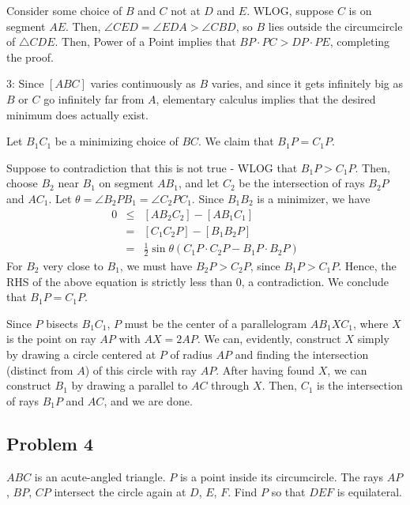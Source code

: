 \begin{mdsoln}
Consider some choice of $B$ and $C$ not at $D$ and $E$. WLOG, suppose $C$ is on segment $AE$. Then, $\angle CED=\angle EDA > \angle CBD $, so $B$ lies outside the circumcircle of $\triangle CDE$. Then, Power of a Point implies that $BP \cdot PC > DP\cdot PE$, completing the proof.

3:
Since $[ABC]$ varies continuously as $B$ varies, and since it gets infinitely big as $B$ or $C$ go infinitely far from $A$, elementary calculus implies that the desired minimum does actually exist.

Let $B_1C_1$ be a minimizing choice of $BC$. We claim that $B_1P=C_1P$.

Suppose to contradiction that this is not true - WLOG that $B_1P>C_1P$. Then, choose $B_2$ near $B_1$ on segment $AB_1$, and let $C_2$ be the intersection of rays $B_2P$ and $AC_1$. Let $\theta=\angle B_2PB_1=\angle C_2PC_1$. Since $B_1B_2$ is a minimizer, we have\begin{eqnarray*}0&\le&[AB_2C_2]-[AB_1C_1]\\ &=&[C_1C_2P]-[B_1B_2P]\\ &=&\frac{1}{2}\sin\theta\left(C_1P\cdot C_2P-B_1P\cdot B_2P\right)\end{eqnarray*}For $B_2$ very close to $B_1$, we must have $B_2P>C_2P$, since $B_1P>C_1P$. Hence, the RHS of the above equation is strictly less than $0$, a contradiction. We conclude that $B_1P=C_1P$.

Since $P$ bisects $B_1C_1$, $P$ must be the center of a parallelogram $AB_1XC_1$, where $X$ is the point on ray $AP$ with $AX=2AP$. We can, evidently, construct $X$ simply by drawing a circle centered at $P$ of radius $AP$ and finding the intersection (distinct from $A$) of this circle with ray $AP$. After having found $X$, we can construct $B_1$ by drawing a parallel to $AC$ through $X$. Then, $C_1$ is the intersection of rays $B_1P$ and $AC$, and we are done.


\end{mdsoln}
\subsection{Problem 4}

$ABC$ is an acute-angled triangle. $P$ is a point inside its circumcircle. The rays $AP$, $BP$, $CP$ intersect the circle again at $D$, $E$, $F$. Find $P$ so that $DEF$ is equilateral.

